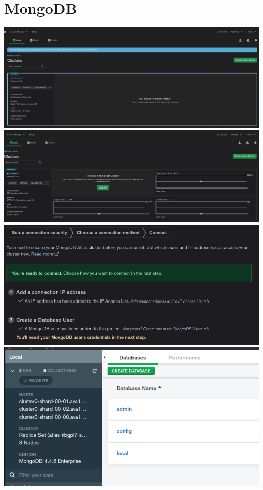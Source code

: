 \documentclass[10pt]{article}
\begin{document}
\section{MongoDB}
\begin{center}
  \includegraphics[scale=0.25]{imgs/5.png}\\
  \includegraphics[scale=0.25]{imgs/6.png}\\
  \includegraphics[scale=0.25]{imgs/7.png}\\
  \includegraphics[scale=0.25]{imgs/8.png}\\

\end{center}
\end{document}
